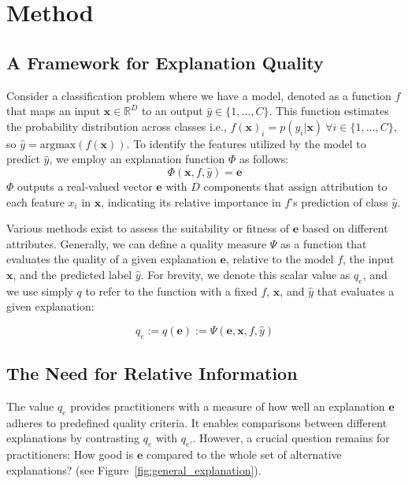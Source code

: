 \section{Method}
\label{sec:Method}


\subsection{A Framework for Explanation Quality}

Consider a classification problem where we have a model, denoted as a function $f$ that maps an input $\mathbf{x}\in\mathbb{R}^D$ to an output $\hat{y}\in \{1, \ldots, C\}$. This function estimates the probability distribution across classes i.e., $f(\mathbf{x})_i=p(y_i|\mathbf{x})~\forall i \in \{1, \ldots, C\}$, so $\hat{y} = \text{argmax}(f(\mathbf{x}))$. To identify the features utilized by the model to predict $\hat{y}$, we employ an explanation function $\Phi$ as follows:
\begin{equation}
    \Phi(\mathbf{x}, f, \hat{y}) = \mathbf{e}
\end{equation}
$\Phi$ outputs a real-valued vector $\mathbf{e}$ with $D$ components that assign attribution to each feature $x_i$ in $\mathbf{x}$, indicating its relative importance in $f$'s prediction of class $\hat{y}$.

Various methods exist to assess the suitability or fitness of $\mathbf{e}$ based on different attributes. Generally, we can define a quality measure $\Psi$ as a function that evaluates the quality of a given explanation $\mathbf{e}$, relative to the model $f$, the input $\mathbf{x}$, and the predicted label $\hat{y}$. For brevity, we denote this scalar value as $q_e$, and we use simply $q$ to refer to the function with a fixed $f$, $\mathbf{x}$, and $\hat{y}$ that evaluates a given explanation:

\begin{equation}
    q_e := q(\mathbf{e}) := \Psi(\mathbf{e}, \mathbf{x}, f, \hat{y})
    \label{eq:q_e}
\end{equation}


\subsection{The Need for Relative Information}
\label{sec:Method_relative}
The value $q_e$ provides practitioners with a measure of how well an explanation $\mathbf{e}$ adheres to predefined quality criteria. It enables comparisons between different explanations by contrasting $q_e$ with $q_{e'}$. However, a crucial question remains for practitioners: How good is $\mathbf{e}$ compared to the whole set of alternative explanations? (see Figure~\ref{fig:general_explanation}).

